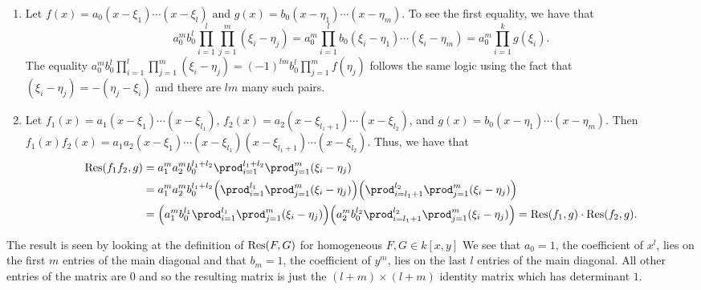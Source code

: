 \documentclass[letterpaper, 11pt, oneside]{book}
\begin{document}
\begin{sol}\label{ex:UAG_3.1.3}
  \begin{enumerate}
    \item Let $f(x) = a_{0}(x - \xi_{1}) \cdots (x - \xi_{l})$ and $g(x) = b_{0}(x - \eta_{1}) \cdots (x - \eta_{m})$.
          To see the first equality, we have that
          \[
            a_{0}^{m} b_{0}^{l} \prod_{i = 1}^{l}\prod_{j = 1}^{m} (\xi_{i} - \eta_{j}) = a_{0}^{m} \prod_{i = 1}^{l} b_{0} (\xi_{i} - \eta_{1}) \cdots (\xi_{i} - \eta_{m}) = a_{0}^{m} \prod_{i = 1}^{k} g(\xi_{i}).
          \]
          The equality $a_{0}^{m} b_{0}^{l} \prod_{i = 1}^{l}\prod_{j = 1}^{m} (\xi_{i} - \eta_{j}) = (-1)^{lm} b_{0}^{l} \prod_{j = 1}^{m} f(\eta_{j})$ follows the same logic using the fact that $(\xi_{i} - \eta_{j}) = -(\eta_{j} - \xi_{i})$ and there are $lm$ many such pairs.
    \item Let $f_{1}(x) = a_{1}(x - \xi_{1}) \cdots (x - \xi_{l_{1}})$, $f_{2}(x) = a_{2}(x - \xi_{l_{1} + 1}) \cdots (x - \xi_{l_{2}})$, and $g(x) = b_{0}(x - \eta_{1}) \cdots (x - \eta_{m})$.
          Then $f_{1}(x) f_{2}(x) = a_{1} a_{2} (x - \xi_{1}) \cdots (x - \xi_{l_{1}}) (x - \xi_{l_{1} + 1}) \cdots (x - \xi_{l_{2}})$.
          Thus, we have that
          \begin{align*}
            \Res(f_{1}f_{2}, g) &= a_{1}^{m}a_{2}^{m}b_{0}^{l_{1} + l_{2}} \prod_{i = 1}^{l_{1} + l_{2}} \prod_{j = 1}^{m} (\xi_{i} - \eta_{j}) \\
                                &= a_{1}^{m}a_{2}^{m}b_{0}^{l_{1} + l_{2}} \pqty{\prod_{i = 1}^{l_{1}} \prod_{j = 1}^{m} (\xi_{i} - \eta_{j})} \pqty{\prod_{i = l_{1} + 1}^{l_{2}} \prod_{j = 1}^{m} (\xi_{i} - \eta_{j})} \\
                                &= \pqty{a_{1}^{m}b_{0}^{l_{1}}  \prod_{i = 1}^{l_{1}} \prod_{j = 1}^{m} (\xi_{i} - \eta_{j})} \pqty{a_{2}^{m}b_{0}^{l_{2}}\prod_{i = l_{1} + 1}^{l_{2}} \prod_{j = 1}^{m} (\xi_{i} - \eta_{j})} = \Res(f_{1}, g) \cdot \Res(f_{2}, g).
          \end{align*}
  \end{enumerate}
\end{sol}

\begin{sol}\label{ex:UAG_3.1.4}
  The result is seen by looking at the definition of $\Res(F, G)$ for homogeneous $F, G \in k[x, y]$
  We see that $a_{0} = 1$, the coefficient of $x^{l}$, lies on the first $m$ entries of the main diagonal and that $b_{m} = 1$, the coefficient of $y^{m}$, lies on the last $l$ entries of the main diagonal.
  All other entries of the matrix are $0$ and so the resulting matrix is just the $(l + m) \times (l + m)$ identity matrix which has determinant $1$.
\end{sol}
\end{document}
